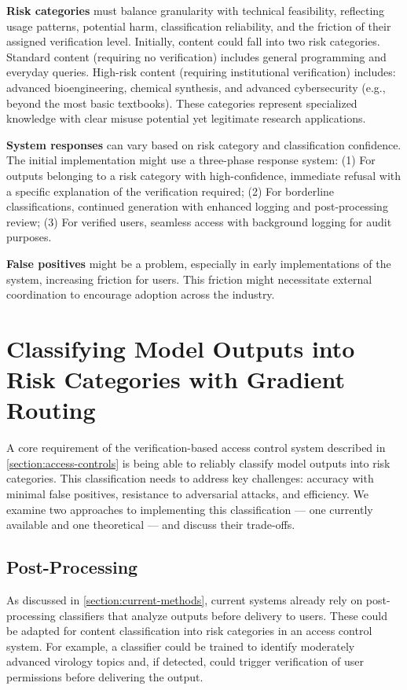 \documentclass{article}
\theoremstyle{plain}
\theoremstyle{definition}
\theoremstyle{remark}
\begin{document}
\textbf{Risk categories} must balance granularity with technical feasibility, reflecting usage patterns, potential harm, classification reliability, and the friction of their assigned verification level. Initially, content could fall into two risk categories. Standard content (requiring no verification) includes general programming and everyday queries. High-risk content (requiring institutional verification) includes: advanced bioengineering, chemical synthesis, and advanced cybersecurity (e.g., beyond the most basic textbooks). These categories represent specialized knowledge with clear misuse potential yet legitimate research applications.

\textbf{System responses} can vary based on risk category and classification confidence.
The initial implementation might use a three-phase response system: (1) For outputs belonging to a risk category with high-confidence, immediate refusal with a specific explanation of the verification required; (2) For borderline classifications, continued generation with enhanced logging and post-processing review; (3) For verified users, seamless access with background logging for audit purposes.

\textbf{False positives} might be a problem, especially in early implementations of the system, increasing friction for users. This friction might necessitate external coordination to encourage adoption across the industry.

\section{Classifying Model Outputs into Risk Categories with Gradient Routing} \label{section:risk-classification}

A core requirement of the verification-based access control system described in \cref{section:access-controls} is being able to reliably classify model outputs into risk categories.
This classification needs to address key challenges: accuracy with minimal false positives, resistance to adversarial attacks, and efficiency.
We examine two approaches to implementing this classification --- one currently available and one theoretical --- and discuss their trade-offs.

\subsection{Post-Processing}

As discussed in \cref{section:current-methods}, current systems already rely on post-processing classifiers that analyze outputs before delivery to users.
These could be adapted for content classification into risk categories in an access control system.
For example, a classifier could be trained to identify moderately advanced virology topics and, if detected, could trigger verification of user permissions before delivering the output.
\end{document}
